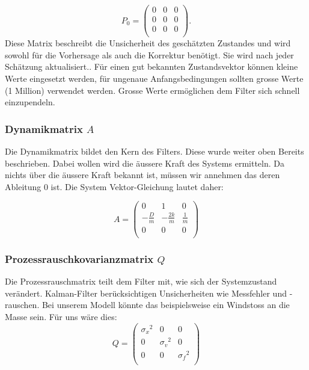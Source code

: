 \begin{equation}
{P_0 }=
\left(
\begin{array}{ccc} 	
0 & 0 &0 \\ 
0 &0 & 0 \\ 
0 & 0 &0 \\
\end{array}
\right).
\end{equation}
Diese Matrix beschreibt die Unsicherheit des geschätzten Zustandes und wird sowohl für die Vorhersage als auch die Korrektur benötigt. Sie wird nach jeder Schätzung aktualisiert.. Für einen gut bekannten Zustandsvektor können kleine Werte eingesetzt werden, für ungenaue Anfangsbedingungen sollten grosse Werte (1 Million) verwendet werden. Grosse Werte ermöglichen dem Filter sich schnell einzupendeln. 


\subsubsection*{Dynamikmatrix $A$}
Die Dynamikmatrix bildet den Kern des Filters. Diese wurde weiter oben Bereits beschrieben. Dabei wollen wird die äussere Kraft des Systems ermitteln.
Da nichts über die äussere Kraft bekannt ist, müssen wir annehmen das deren Ableitung 0 ist.
Die System Vektor-Gleichung lautet daher:


\begin{equation}
A = \left(
 \begin{array}{ccc} 	
0 & 1& 0 \\
- \frac{D}{m} &-\frac{2k}{m} & \frac{1} {m}\\
0 & 0& 0\\ 
\end{array}\right)  
\end{equation} 

\subsubsection*{Prozessrauschkovarianzmatrix $Q$}
Die Prozessrauschmatrix teilt dem Filter mit, wie sich der Systemzustand verändert. Kalman-Filter berücksichtigen Unsicherheiten wie Messfehler und -rauschen. Bei unserem Modell könnte das beispielsweise ein Windstoss an die Masse sein. Für uns wäre dies:
\begin{equation}
Q = \left(
 \begin{array}{ccc} 	
{\sigma_x }^2& 0& 0 \\ 
0 & {\sigma_v }^2& 0\\ 
0 & 0& {\sigma_f }^2\\
\end{array}\right)  
\end{equation} 

